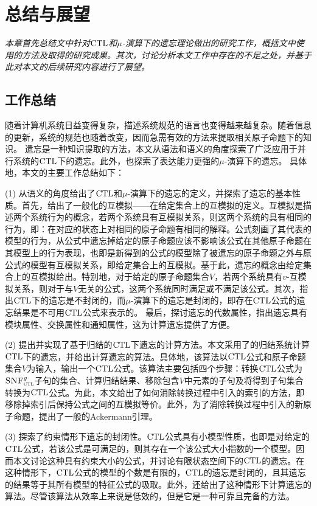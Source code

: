 \chapter{总结与展望}\label{chapter09}
{\em 本章首先总结文中针对$\textrm{CTL}$和$\mu$-演算下的遗忘理论做出的研究工作，概括文中使用的方法及取得的研究成果。其次，讨论分析本文工作中存在的不足之处，并基于此对本文的后续研究内容进行了展望。}

\section{工作总结}
随着计算机系统日益变得复杂，描述系统规范的语言也变得越来越复杂。随着信息的更新，系统的规范也随着改变，因而急需有效的方法来提取相关原子命题下的知识。
遗忘是一种知识提取的方法，本文从语法和语义的角度探索了广泛应用于并行系统的$\textrm{CTL}$下的遗忘。此外，也探索了表达能力更强的$\mu$-演算下的遗忘。
具体地，本文的主要工作总结如下：

(1) 从语义的角度给出了$\textrm{CTL}$和$\mu$-演算下的遗忘的定义，并探索了遗忘的基本性质。首先，给出了一般化的互模拟——在给定集合上的互模拟的定义。互模拟是描述两个系统行为的概念，若两个系统具有互模拟关系，则这两个系统的具有相同的行为，即：在对应的状态上对相同的原子命题有相同的解释。公式刻画了其代表的模型的行为，从公式中遗忘掉给定的原子命题应该不影响该公式在其他原子命题在其模型上的行为表现，也即是新得到的公式的模型除了被遗忘的原子命题之外与原公式的模型有互模拟关系，即给定集合上的互模拟。基于此，遗忘的概念由给定集合上的互模拟给出。特别地，对于给定的原子命题集合$V$，若两个系统具有$v$-互模拟关系，则对于与$V$无关的公式，这两个系统同时满足或不满足该公式。其次，指出$\textrm{CTL}$下的遗忘是不封闭的，而$\mu$-演算下的遗忘是封闭的，即存在$\textrm{CTL}$公式的遗忘结果是不可用$\textrm{CTL}$公式来表示的。
最后，探讨遗忘的代数属性，指出遗忘具有模块属性、交换属性和通知属性，这为计算遗忘提供了方便。

(2) 提出并实现了基于归结的$\textrm{CTL}$下遗忘的计算方法。本文采用了\citeauthor{zhang2014resolution}的归结系统计算$\textrm{CTL}$下的遗忘，并给出计算遗忘的算法。具体地，该算法以$\textrm{CTL}$公式和原子命题集合$V$为输入，输出一个$\textrm{CTL}$公式。该算法主要包括四个步骤：转换$\textrm{CTL}$公式为${\textsc{SNF}_{\textsc{ctl}}^g}$子句的集合、计算归结结果、移除包含$V$中元素的子句及将得到子句集合转换为$\textrm{CTL}$公式。为此，本文给出了如何消除转换过程中引入的索引的方法，即移除掉索引后保持公式之间的互模拟等价。此外，为了消除转换过程中引入的新原子命题，提出了一般的Ackermann引理。

(3) 探索了约束情形下遗忘的封闭性。$\textrm{CTL}$公式具有小模型性质，也即是对给定的$\textrm{CTL}$公式，若该公式是可满足的，则其存在一个该公式大小指数的一个模型。因而本文讨论这种具有约束大小的公式，并讨论有限状态空间下的$\textrm{CTL}$的遗忘。在这种情形下，$\textrm{CTL}$公式的模型的个数是有限的，$\textrm{CTL}$的遗忘是封闭的，且其遗忘的结果等于其所有模型的特征公式的吸取。此外，还给出了这种情形下计算遗忘的算法。尽管该算法从效率上来说是低效的，但是它是一种可靠且完备的方法。

